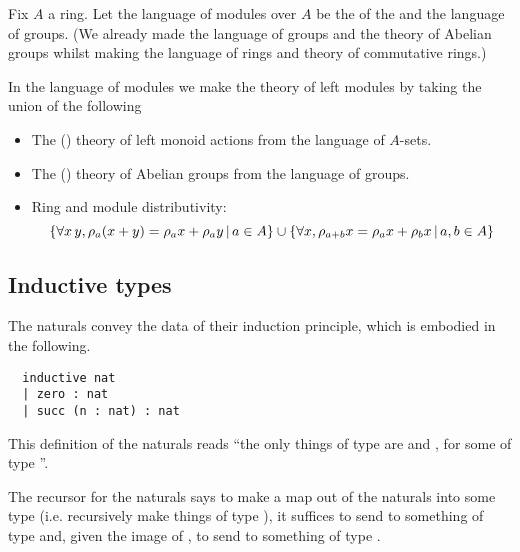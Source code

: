 \begin{dfn}[Modules]
  Fix $A$ a ring.
  Let the language of modules over $A$ be the 
  of the  and the language of groups.
  (We already made the language of groups and the theory of Abelian groups
  whilst making the language of rings and theory of commutative rings.)

  In the language of modules we make the theory of left modules by taking the
  union of the following
  \begin{itemize}
    \item The () theory of left monoid actions
          from the language of $A$-sets.
    \item The () theory of Abelian groups
          from the language of groups.
    \item Ring and module distributivity:
          \[
            \left\{ \forall x \, y, \rho_{a} (x + y) = \rho_{a} x + \rho_{a} y \,|\, a \in A \right\}
            \cup
            \left\{ \forall x, \rho_{a + b} x = \rho_{a} x + \rho_{b} x \,|\, a , b \in A \right\}
          \]
  \end{itemize}
\end{dfn}

\subsection{Inductive types}

\begin{dfn}

  The naturals convey the data of their induction principle,
  which is embodied in the following.

  \begin{lstlisting}
  inductive nat
  | zero : nat
  | succ (n : nat) : nat \end{lstlisting}
  This definition of the naturals reads
  ``the only things of type  are
   and ,
  for some  of type ''.
\end{dfn}

The recursor for the naturals says to make a map out of the naturals
into some type  (i.e. recursively make things of type ),
it suffices to send  to something of type 
and, given the image of ,
to send  to something of type .

